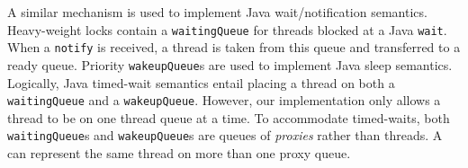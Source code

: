 A similar mechanism is used to implement Java wait/notification
semantics.  Heavy-weight locks contain a {\tt waitingQueue} for
threads blocked at a Java {\tt wait}.  When a {\tt notify} is
received, a thread is taken from this queue and transferred to a ready
queue.  Priority {\tt wakeupQueue}s are used to implement Java sleep
semantics.  Logically, Java timed-wait semantics entail placing a
thread on both a {\tt waitingQueue} and a {\tt wakeupQueue}.  However, our
implementation only allows a thread to be on one thread queue at
a time.  To accommodate timed-waits, both {\tt waitingQueue}s and
{\tt wakeupQueue}s are queues of {\em proxies} rather than threads.
A  can represent the same thread
on more than one proxy queue.

\JavaTMFooter
\JikesTMFooter
